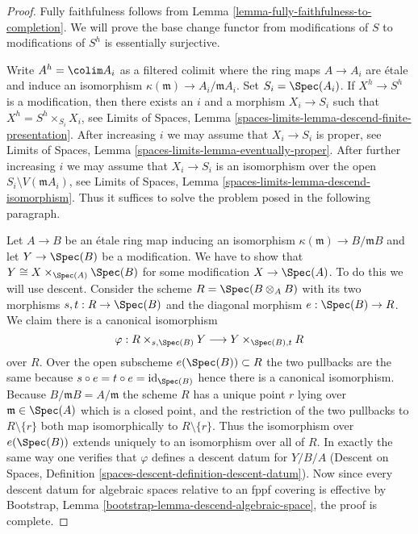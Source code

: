 \begin{proof}
Fully faithfulness follows from
Lemma \ref{lemma-fully-faithfulness-to-completion}.
We will prove the base change functor from modifications of $S$ to
modifications of $S^h$ is essentially surjective.

\medskip\noindent
Write $A^h = \colim A_i$ as a filtered colimit where the ring maps
$A \to A_i$ are \'etale and induce an isomorphism
$\kappa(\mathfrak m) \to A_i/\mathfrak m A_i$. Set $S_i = \Spec(A_i)$.
If $X^h \to S^h$ is a modification, then there exists an $i$ and
a morphism $X_i \to S_i$ such that $X^h = S^h \times_{S_i} X_i$, see
Limits of Spaces, Lemma \ref{spaces-limits-lemma-descend-finite-presentation}.
After increasing $i$ we may assume that $X_i \to S_i$ is
proper, see
Limits of Spaces, Lemma \ref{spaces-limits-lemma-eventually-proper}.
After further increasing $i$ we may assume that
$X_i \to S_i$ is an isomorphism over the open
$S_i \setminus V(\mathfrak m A_i)$, see
Limits of Spaces, Lemma \ref{spaces-limits-lemma-descend-isomorphism}.
Thus it suffices to solve the problem posed in the following paragraph.

\medskip\noindent
Let $A \to B$ be an \'etale ring map inducing an isomorphism
$\kappa(\mathfrak m) \to B/\mathfrak m B$ and let $Y \to \Spec(B)$
be a modification. We have to show that $Y \cong X \times_{\Spec(A)} \Spec(B)$
for some modification $X \to \Spec(A)$. To do this we will use descent.
Consider the scheme $R = \Spec(B \otimes_A B)$ with its two morphisms
$s, t : R \to \Spec(B)$ and the diagonal morphism $e : \Spec(B) \to R$.
We claim there is a canonical isomorphism
$$
\varphi :
R \times_{s, \Spec(B)} Y
\longrightarrow
Y \times_{\Spec(B), t} R
$$
over $R$. Over the open subscheme $e(\Spec(B)) \subset R$ the two
pullbacks are the same because $s \circ e = t \circ e = \text{id}_{\Spec(B)}$
hence there is a canonical isomorphism. Because
$B/\mathfrak m B = A/\mathfrak m$ the scheme $R$ has a unique
point $r$ lying over $\mathfrak m \in \Spec(A)$ which is a closed point,
and the restriction of the two pullbacks to $R \setminus \{r\}$ both map
isomorphically to $R \setminus \{r\}$. Thus the isomorphism over
$e(\Spec(B))$ extends uniquely to an isomorphism over all of $R$.
In exactly the same way one verifies that $\varphi$ defines a descent
datum for $Y/B/A$ (Descent on Spaces, Definition
\ref{spaces-descent-definition-descent-datum}). Now since every
descent datum for algebraic spaces relative to an fppf covering
is effective by Bootstrap, Lemma \ref{bootstrap-lemma-descend-algebraic-space},
the proof is complete.
\end{proof}

